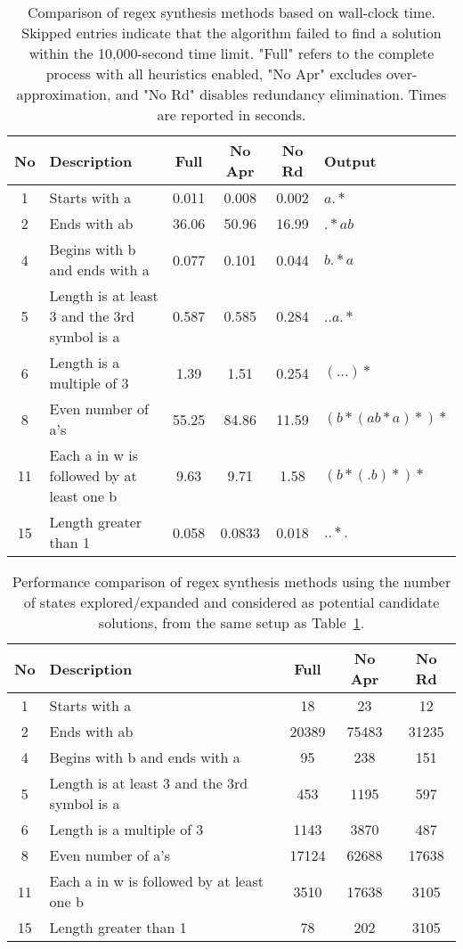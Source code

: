 \begin{table}[h!]
\centering
\caption{Comparison of regex synthesis methods based on wall-clock time. Skipped entries indicate that the algorithm failed to find a solution within the 10,000-second time limit. "Full" refers to the complete process with all heuristics enabled, "No Apr" excludes over-approximation, and "No Rd" disables redundancy elimination. Times are reported in seconds.}
\label{tab:alpha_regex_performance_seconds}
\begin{tabular}{|c|p{5cm}|c|c|c|l|}
\hline
\textbf{No} & \textbf{Description} & \textbf{Full} & \textbf{No Apr} & \textbf{No Rd} & \textbf{Output} \\
\hline
1 & Starts with a & 0.011 & 0.008 & 0.002 & $a.*$ \\
2 & Ends with ab & 36.06 & 50.96 & 16.99 & $.*ab$ \\
4 & Begins with b and ends with a & 0.077 & 0.101 & 0.044 & $b.*a$ \\
5 & Length is at least 3 and the 3rd symbol is a & 0.587 & 0.585 & 0.284 & $..a.*$ \\
6 & Length is a multiple of 3 & 1.39 & 1.51 & 0.254 & $(...)*$ \\
8 & Even number of a's & 55.25 & 84.86 & 11.59 & $(b*(ab*a)*)*$ \\
11 & Each a in w is followed by at least one b & 9.63 & 9.71 & 1.58 & $(b*(.b)*)*$ \\
15 & Length greater than 1 & 0.058 & 0.0833 & 0.018 & $..*.$ \\
\hline
\end{tabular}
\end{table}

\begin{table}[h!]
	\centering
	\caption{Performance comparison of regex synthesis methods using the number of states explored/expanded and considered as potential candidate solutions, from the same setup as Table~\ref{tab:alpha_regex_performance_seconds}.}
	\label{tab:alpha_regex_performance_states}
	\begin{tabular}{|c|p{5cm}|c|c|c|}
	\hline
	\textbf{No} & \textbf{Description} & \textbf{Full} & \textbf{No Apr} & \textbf{No Rd} \\
	\hline
	1 & Starts with a & 18 & 23 & 12 \\
	2 & Ends with ab & 20389 & 75483 & 31235 \\
	4 & Begins with b and ends with a & 95 & 238 & 151 \\
	5 & Length is at least 3 and the 3rd symbol is a & 453 & 1195 & 597 \\
	6 & Length is a multiple of 3 & 1143 & 3870 & 487 \\
	8 & Even number of a's & 17124 & 62688 & 17638 \\
	11 & Each a in w is followed by at least one b & 3510 & 17638 & 3105 \\
	15 & Length greater than 1 & 78 & 202 & 3105 \\
	\hline
\end{tabular}
\end{table}

